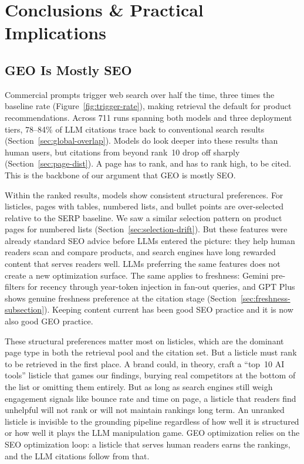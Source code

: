 \chapter{Conclusions \& Practical Implications}
\label{ch:conclusions}

\section{GEO Is Mostly SEO}
\label{sec:geo-is-seo}

Commercial prompts trigger web search over half the time, three
times the baseline rate (Figure~\ref{fig:trigger-rate}), making
retrieval the default for product recommendations. Across 711
runs spanning both models and three deployment tiers, 78--84\% of
LLM citations trace back to conventional search results
(Section~\ref{sec:global-overlap}). Models do look deeper into these
results than human users, but citations from beyond rank~10 drop
off sharply (Section~\ref{sec:page-dist}). A page has to rank, and has to rank high, to be cited.
This is the backbone of our argument that GEO is mostly SEO.

Within the ranked results, models show consistent structural
preferences. For listicles, pages with tables, numbered lists, and
bullet points are over-selected relative to the SERP baseline. We
saw a similar selection pattern on product pages for numbered lists
(Section~\ref{sec:selection-drift}). But these features were already standard SEO advice before LLMs
entered the picture: they help human readers scan and compare products,
and search engines have long rewarded content that serves readers
well. LLMs preferring the same features does not create a new
optimization surface. The same applies to freshness: Gemini
pre-filters for recency through year-token injection in fan-out
queries, and GPT Plus shows genuine freshness preference at the
citation stage (Section~\ref{sec:freshness-subsection}). Keeping
content current has been good SEO practice and it is now also good
GEO practice.

These structural preferences matter most on listicles, which are
the dominant page type in both the retrieval pool and the citation
set. But a listicle must rank to be retrieved in the first place.
A brand could, in theory, craft a ``top~10 AI tools''
listicle that games our findings, burying real competitors at the
bottom of the list or omitting them entirely. But as long as search engines still weigh engagement
signals like bounce rate and time on page, a listicle that readers
find unhelpful will not rank or will not maintain rankings long term.
An unranked listicle is invisible to the grounding pipeline
regardless of how well it is structured or how well it plays the LLM
manipulation game. GEO optimization relies on the SEO optimization
loop: a listicle that serves human readers earns the rankings, and
the LLM citations follow from that.

